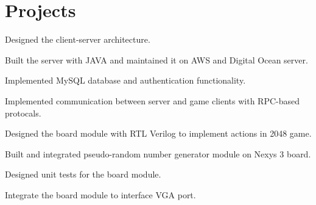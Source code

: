 \documentclass[]{deedy-resume-openfont}
\begin{document}
\begin{minipage}[t]{0.64\textwidth} 


\section{Projects}

\vspace{\topsep} %
\begin{tightemize}
	\item Designed the client-server architecture.
	\item Built the server with JAVA and maintained it on AWS and Digital Ocean server.
	\item Implemented MySQL database and authentication functionality.
	\item Implemented communication between server and game clients with RPC-based protocals.
\end{tightemize}
\sectionsep

\begin{tightemize}
	\item Designed the board module with RTL Verilog to implement actions in 2048 game.
	\item Built and integrated pseudo-random number generator module on Nexys 3 board.
	\item Designed unit tests for the board module.
	\item Integrate the board module to interface VGA port.
\end{tightemize}
\sectionsep




\end{minipage}
\end{document}
